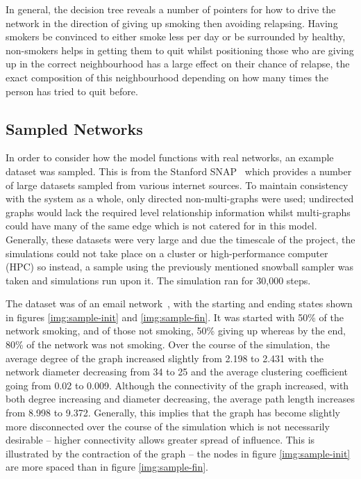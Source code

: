 \documentclass[]{report}
\begin{document}
In general, the decision tree reveals a number of pointers for how to drive the network in the direction of giving up smoking then avoiding relapsing. Having smokers be convinced to either smoke less per day or be surrounded by healthy, non-smokers helps in getting them to quit whilst positioning those who are giving up in the correct neighbourhood has a large effect on their chance of relapse, the exact composition of this neighbourhood depending on how many times the person has tried to quit before.

\subsection{Sampled Networks}
In order to consider how the model functions with real networks, an example dataset was sampled. This is from the Stanford SNAP~\cite{SNAP} which provides a number of large datasets sampled from various internet sources. To maintain consistency with the system as a whole, only directed non-multi-graphs were used; undirected graphs would lack the required level relationship information whilst multi-graphs could have many of the same edge which is not catered for in this model. Generally, these datasets were very large and due the timescale of the project, the simulations could not take place on a cluster or high-performance computer (HPC) so instead, a sample using the previously mentioned snowball sampler was taken and simulations run upon it. The simulation ran for 30,000 steps.

The dataset was of an email network~\cite{SNAP-email}, with the starting and ending states shown in figures \ref{img:sample-init} and \ref{img:sample-fin}. It was started with 50\% of the network smoking, and of those not smoking, 50\% giving up whereas by the end, 80\% of the network was not smoking. Over the course of the simulation, the average degree of the graph increased slightly from 2.198 to 2.431 with the network diameter decreasing from 34 to 25 and the average clustering coefficient going from 0.02 to 0.009. Although the connectivity of the graph increased, with both degree increasing and diameter decreasing, the average path length increases from 8.998 to 9.372. Generally, this implies that the graph has become slightly more disconnected over the course of the simulation which is not necessarily desirable – higher connectivity allows greater spread of influence. This is illustrated by the contraction of the graph – the nodes in figure \ref{img:sample-init} are more spaced than in figure \ref{img:sample-fin}.
\end{document}
